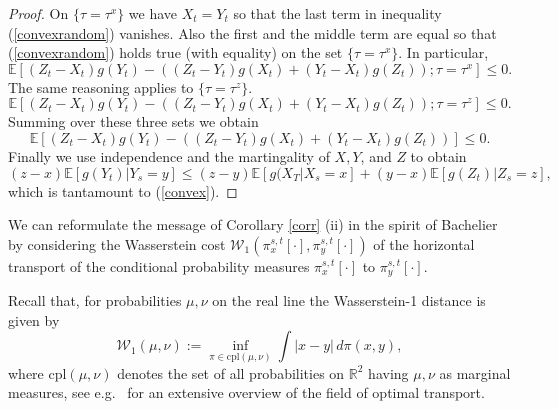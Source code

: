 \documentclass[11pt,a4paper]{article}%
\def\E{{\mathbb E}}
\def\R{{\mathbb R}}
\newtheorem{remark}[theorem]{Remark}
\numberwithin{equation}{section}
\begin{document}
\begin{proof}
On $\{\tau = \tau^x\}$ we have $X_t = Y_t $ so that the last term in inequality (\ref{convexrandom}) vanishes. Also the first and the middle term are equal so that (\ref{convexrandom}) holds true (with equality) on the set $\{\tau = \tau^x\}$. In particular,
\begin{equation}\label{convexexp1}
\E\left[(Z_t-X_t) g(Y_t) - \left( (Z_t-Y_t) g(X_t) + (Y_t-X_t)g(Z_t)\right);\tau = \tau^x\right] \le 0.
\end{equation}
The same reasoning applies to $\{\tau = \tau^z\}$. 
\begin{equation}\label{convexexp2}
\E\left[(Z_t-X_t) g(Y_t) - \left( (Z_t-Y_t) g(X_t) + (Y_t-X_t)g(Z_t)\right);\tau = \tau^z\right] \le 0.
\end{equation}
Summing over these three sets we obtain
\begin{equation}\label{convexexp3}
\E\left[(Z_t-X_t) g(Y_t) - \left( (Z_t-Y_t) g(X_t) + (Y_t-X_t)g(Z_t)\right)\right] \le 0.
\end{equation}
Finally we use independence and the martingality of $X,Y$, and $Z$ to obtain
\begin{equation}\label{convex1}
(z-x) \E[g(Y_t)|Y_s=y] \le  (z-y)\E[g(X_T|X_s=x] + (y-x)\E[g(Z_t)|Z_s=z],
\end{equation}
which is tantamount to (\ref{convex}).
\end{proof}


We can reformulate the message of Corollary \ref{corr} (ii) in the spirit of Bachelier by considering the Wasserstein cost $\mathcal{W}_1 (\pi_x^{s,t}[ \cdot] , \pi_y^{s,t}[ \cdot])$ of the horizontal transport of the conditional probability measures $ \pi_x^{s,t}[ \cdot]$ to $ \pi_y^{s,t}[ \cdot]$.

Recall that, for probabilities $\mu, \nu$ on the real line the Wasserstein-1 distance is given by 
\[ \mathcal{W}_1(\mu, \nu):=\inf_{\pi \in \text{cpl}(\mu, \nu)} \int |x-y|\, d\pi(x,y), \]
where $\text{cpl}(\mu, \nu)$ denotes the set of all probabilities on $\R^2$ having $\mu, \nu$ as marginal measures, see e.g.\ \cite{Vi09} for an extensive overview of the field of optimal transport. 
\end{document}
